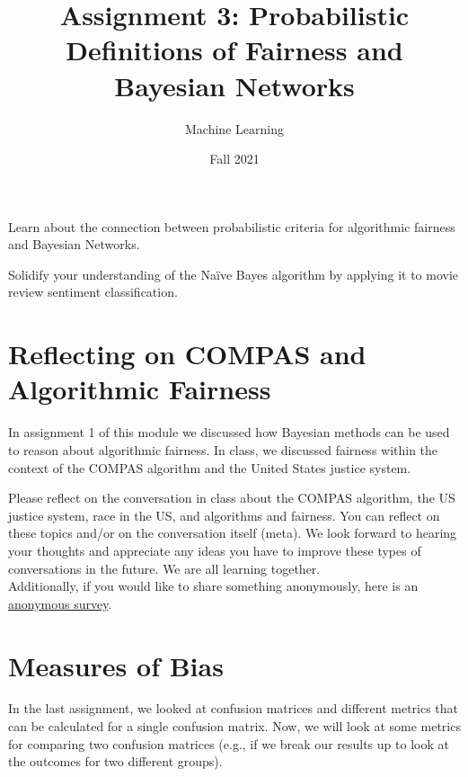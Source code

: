 \documentclass[assignment03_Solutions]{subfiles}
\title{Assignment 3: Probabilistic Definitions of Fairness and Bayesian Networks}
\author{Machine Learning}
\date{Fall 2021}
\begin{document}
\maketitle
\thispagestyle{firstpage}


\begin{learningobjectives}
\bi
\item Learn about the connection between probabilistic criteria for algorithmic fairness and Bayesian Networks.
\item Solidify your understanding of the Na\"ive Bayes algorithm by applying it to movie review sentiment classification.
\ei
\end{learningobjectives}


\section{Reflecting on COMPAS and Algorithmic Fairness}

In assignment 1 of this module we discussed how Bayesian methods can be used to reason about algorithmic fairness.  In class, we discussed fairness within the context of the COMPAS algorithm and the United States justice system.


\begin{exercise}[(15 minutes)]
Please reflect on the conversation in class about the COMPAS algorithm, the US justice system, race in the US, and algorithms and fairness. You can reflect on these topics and/or on the conversation itself (meta). We look forward to hearing your thoughts and appreciate any ideas you have to improve these types of conversations in the future. We are all learning together.\\

Additionally, if you would like to share something anonymously, here is an \href{https://docs.google.com/forms/d/e/1FAIpQLSf1NUDOQR6I0PcNyuaitbShR38pq5AgAiZnFnHtJCa28O-F4Q/viewform?usp=sf_link}{anonymous survey}.

\end{exercise}


\section{Measures of Bias}
In the last assignment, we looked at confusion matrices and different metrics that can be calculated for a single confusion matrix. Now, we will look at some metrics for comparing two confusion matrices (e.g., if we break our results up to look at the outcomes for two different groups).\\
\end{document}
